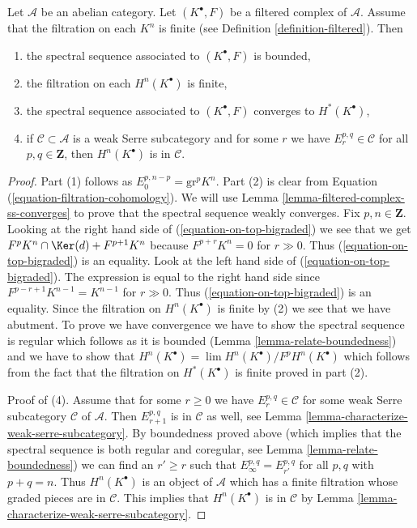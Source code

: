 \begin{lemma}
\label{lemma-biregular-ss-converges}
Let $\mathcal{A}$ be an abelian category. Let $(K^\bullet, F)$ be a
filtered complex of $\mathcal{A}$. Assume that the filtration on each $K^n$
is finite (see Definition \ref{definition-filtered}). Then
\begin{enumerate}
\item the spectral sequence associated to $(K^\bullet, F)$ is bounded,
\item the filtration on each $H^n(K^\bullet)$ is finite,
\item the spectral sequence associated to $(K^\bullet, F)$ converges
to $H^*(K^\bullet)$,
\item if $\mathcal{C} \subset \mathcal{A}$ is a weak Serre subcategory
and for some $r$ we have $E_r^{p, q} \in \mathcal{C}$ for all
$p, q \in \mathbf{Z}$, then $H^n(K^\bullet)$ is in $\mathcal{C}$.
\end{enumerate}
\end{lemma}

\begin{proof}
Part (1) follows as $E_0^{p, n - p} = \text{gr}^p K^n$.
Part (2) is clear from Equation (\ref{equation-filtration-cohomology}).
We will use Lemma \ref{lemma-filtered-complex-ss-converges} to prove
that the spectral sequence weakly converges. Fix $p, n \in \mathbf{Z}$.
Looking at the right hand side of (\ref{equation-on-top-bigraded})
we see that we get $F^pK^n \cap \Ker(d) + F^{p + 1}K^n$ because
$F^{p + r}K^n = 0$ for $r \gg 0$. Thus (\ref{equation-on-top-bigraded})
is an equality. Look at the left hand side of (\ref{equation-on-top-bigraded}).
The expression is equal to the right hand side since
$F^{p - r + 1}K^{n - 1} = K^{n - 1}$ for $r \gg 0$.
Thus (\ref{equation-on-top-bigraded}) is an equality. Since the filtration
on $H^n(K^\bullet)$ is finite by (2) we see that we have abutment.
To prove we have convergence we have to show the spectral sequence is
regular which follows as it is bounded
(Lemma \ref{lemma-relate-boundedness}) and we have
to show that $H^n(K^\bullet) = \lim H^n(K^\bullet)/F^pH^n(K^\bullet)$
which follows from the fact that the filtration on $H^*(K^\bullet)$
is finite proved in part (2).

\medskip\noindent
Proof of (4). Assume that for some $r \geq 0$ we have
$E_r^{p, q} \in \mathcal{C}$ for some weak Serre subcategory
$\mathcal{C}$ of $\mathcal{A}$. Then $E_{r + 1}^{p, q}$ is
in $\mathcal{C}$ as well, see
Lemma \ref{lemma-characterize-weak-serre-subcategory}.
By boundedness proved above (which implies that the spectral sequence
is both regular and coregular, see Lemma \ref{lemma-relate-boundedness})
we can find an $r' \geq r$ such that $E_\infty^{p, q} = E_{r'}^{p, q}$
for all $p, q$ with $p + q = n$. Thus $H^n(K^\bullet)$ is an object
of $\mathcal{A}$ which has a finite filtration whose graded pieces
are in $\mathcal{C}$. This implies that $H^n(K^\bullet)$ is in $\mathcal{C}$
by Lemma \ref{lemma-characterize-weak-serre-subcategory}.
\end{proof}

